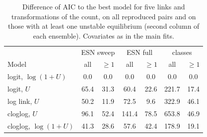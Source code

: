 \begin{table}
\caption{Difference of AIC to the best model for five links and transformations of the count, on all reproduced pairs and on
those with at least one unstable equilibrium (second column of each ensemble). Covariates as in the main fits.}
\label{tab:sm_links}
\begin{ruledtabular}
\begin{tabular}{lcccccc}
 & \multicolumn{2}{c}{ESN sweep} & \multicolumn{2}{c}{ESN full} & \multicolumn{2}{c}{classes} \\
Model & all & $\ge1$ & all & $\ge1$ & all & $\ge1$ \\
\hline
logit, $\log(1+U)$ & 0.0 & 0.0 & 0.0 & 0.0 & 0.0 & 0.0 \\
logit, $U$ & 65.4 & 31.3 & 60.4 & 22.6 & 221.7 & 17.4 \\
log link, $U$ & 50.2 & 11.9 & 72.5 & 9.6 & 322.9 & 46.1 \\
cloglog, $U$ & 96.1 & 52.4 & 141.4 & 78.5 & 653.8 & 46.9 \\
cloglog, $\log(1+U)$ & 41.3 & 28.6 & 57.6 & 42.4 & 178.9 & 19.1 \\
\end{tabular}
\end{ruledtabular}
\end{table}
